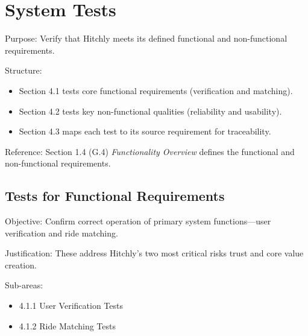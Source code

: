 \documentclass[12pt, titlepage]{article}
\begin{document}




\section{System Tests}

Purpose: Verify that Hitchly meets its defined functional and non-functional requirements.

Structure: 
\begin{itemize}
    \item Section 4.1 tests core functional requirements (verification and matching).
    \item Section 4.2 tests key non-functional qualities (reliability and usability).
    \item Section 4.3 maps each test to its source requirement for traceability.
\end{itemize}

Reference: Section 1.4 (G.4) \textit{Functionality Overview} defines the functional and non-functional requirements.

\subsection{Tests for Functional Requirements}

Objective: Confirm correct operation of primary system functions—user verification and ride matching.

Justification: These address Hitchly’s two most critical risks trust and core value creation.

Sub-areas:
\begin{itemize}
    \item 4.1.1 User Verification Tests
    \item 4.1.2 Ride Matching Tests
\end{itemize}
\end{document}
